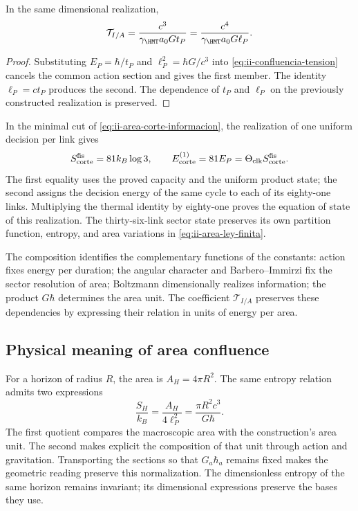 \begin{proposition}
\label{prop:ii-confluencia-tension}
In the same dimensional realization,
\begin{equation}
 \mathcal T_{I/A}
 =\frac{c^3}{\gamma_{\HMT}a_0G t_P}
 =\frac{c^4}{\gamma_{\HMT}a_0G\ell_P}.
 \label{eq:ii-confluencia-tension-gravedad}
\end{equation}
\end{proposition}
\begin{proof}
Substituting \(E_P=\hbar/t_P\) and \(\ell_P^2=\hbar G/c^3\)
into \eqref{eq:ii-confluencia-tension} cancels the common action
section and gives the first member. The identity \(\ell_P=ct_P\)
produces the second. The dependence of \(t_P\) and
\(\ell_P\) on the previously constructed realization is preserved.
\end{proof}

In the minimal cut of \eqref{eq:ii-area-corte-informacion}, the
realization of one uniform decision per link gives
\begin{equation}
 S_{\rm corte}^{\rm fis}=81k_B\log3,
 \qquad
 E_{\rm corte}^{(1)}=81E_P
 =\Theta_{\rm clk}S_{\rm corte}^{\rm fis}.
 \label{eq:ii-confluencia-corte-energia}
\end{equation}
The first equality uses the proved capacity and the uniform product
state; the second assigns the decision energy of the same cycle to
each of its eighty-one links. Multiplying the thermal identity
by eighty-one proves the equation of state of this realization.
The thirty-six-link sector state preserves its own
partition function, entropy, and area variations in
\eqref{eq:ii-area-ley-finita}.

The composition identifies the complementary functions of the
constants: action fixes energy per duration; the angular character
and Barbero--Immirzi fix the sector resolution of area; Boltzmann
dimensionally realizes information; the product \(G\hbar\)
determines the area unit. The coefficient \(\mathcal T_{I/A}\)
preserves these dependencies by expressing their relation in units of
energy per area.

\subsection{Physical meaning of area confluence}

For a horizon of radius \(R\), the area is \(A_H=4\pi R^2\).
The same entropy relation admits two expressions
\[
 \frac{S_H}{k_B}=\frac{A_H}{4\ell_P^2}
 =\frac{\pi R^2c^3}{G\hbar}.
\]
The first quotient compares the macroscopic area with the construction's
area unit. The second makes explicit the composition of that unit
through action and gravitation. Transporting the sections so
that \(G_a\hbar_a\) remains fixed makes the geometric reading preserve
this normalization. The dimensionless entropy of the same horizon remains
invariant; its dimensional expressions preserve the bases they
use.

